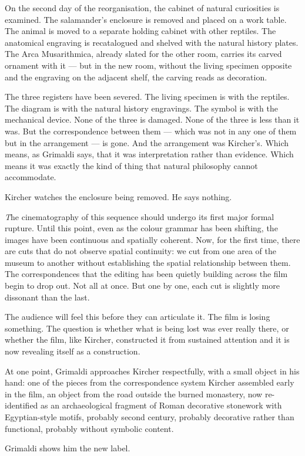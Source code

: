 \documentclass[12pt, a4paper, twoside]{memoir}
\theoremstyle{definition}
\theoremstyle{remark}
\newenvironment{action}{%
  \vspace{4pt}%
  \noindent\begin{minipage}{\linewidth}%
  \setlength{\parindent}{0pt}%
  \itshape\color{kircherink}%
}{%
  \end{minipage}\vspace{6pt}%
}
\newenvironment{visual}{%
  \vspace{6pt}%
  \noindent\begin{mdframed}[
    linecolor=plaguegrey,
    linewidth=0.4pt,
    leftline=true, rightline=false, topline=false, bottomline=false,
    innerleftmargin=8pt,
    innerrightmargin=0pt,
    innertopmargin=2pt,
    innerbottommargin=2pt,
    backgroundcolor=white
  ]%
  \footnotesize\color{plaguegrey}\textit
}{%
  \end{mdframed}\vspace{4pt}%
}
\newcommand{\salamander}[1]{%
  \marginnote{\color{arkgold!80}\scriptsize\bfseries[S\,#1]}%
}
\begin{document}
\begin{action}
On the second day of the reorganisation, the cabinet of natural curiosities is examined. The salamander's enclosure is removed and placed on a work table. The animal is moved to a separate holding cabinet with other reptiles. The anatomical engraving is recatalogued and shelved with the natural history plates. The Arca Musarithmica, already slated for the other room, carries its carved ornament with it --- but in the new room, without the living specimen opposite and the engraving on the adjacent shelf, the carving reads as decoration.

\salamander{III} The three registers have been severed. The living specimen is with the reptiles. The diagram is with the natural history engravings. The symbol is with the mechanical device. None of the three is damaged. None of the three is less than it was. But the correspondence between them --- which was not in any one of them but in the arrangement --- is gone. And the arrangement was Kircher's. Which means, as Grimaldi says, that it was interpretation rather than evidence. Which means it was exactly the kind of thing that natural philosophy cannot accommodate.

Kircher watches the enclosure being removed. He says nothing.
\end{action}

\begin{visual}
The cinematography of this sequence should undergo its first major formal rupture. Until this point, even as the colour grammar has been shifting, the images have been continuous and spatially coherent. Now, for the first time, there are cuts that do not observe spatial continuity: we cut from one area of the museum to another without establishing the spatial relationship between them. The correspondences that the editing has been quietly building across the film begin to drop out. Not all at once. But one by one, each cut is slightly more dissonant than the last.

The audience will feel this before they can articulate it. The film is losing something. The question is whether what is being lost was ever really there, or whether the film, like Kircher, constructed it from sustained attention and it is now revealing itself as a construction.
\end{visual}

\begin{action}
At one point, Grimaldi approaches Kircher respectfully, with a small object in his hand: one of the pieces from the correspondence system Kircher assembled early in the film, an object from the road outside the burned monastery, now re-identified as an archaeological fragment of Roman decorative stonework with Egyptian-style motifs, probably second century, probably decorative rather than functional, probably without symbolic content.

Grimaldi shows him the new label.
\end{action}
\end{document}
